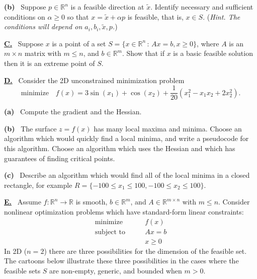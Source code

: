 \documentclass[11pt]{amsart}
\newcommand{\RR}{{\mathbb{R}}}
\newcommand{\prob}[1]{\bigskip\noindent\large\textbf{\underline{#1.}} \, \normalsize}
\newcommand{\epart}[1]{\medskip\noindent \textbf{(#1)} \,}
\begin{document}
\epart{b}  Suppose $p\in\RR^n$ is a feasible direction at $\tilde x$.  Identify necessary and sufficient conditions on $\alpha \ge 0$ so that $x = \tilde x + \alpha p$ is feasible, that is, $x\in S$.  (\emph{Hint. The conditions will depend on $a_i,b_i,\tilde x,p$.})


\prob{C}  Suppose $x$ is a point of a set $S = \{x \in \RR^n\,:\,Ax=b, x\ge 0\}$, where $A$ is an $m\times n$ matrix with $m\le n$, and $b\in\RR^m$.  Show that if $x$ is a basic feasible solution then it is an extreme point of $S$.


\prob{D}  Consider the 2D unconstrained minimization problem
    $$\text{minimize} \quad f(x)=3\sin(x_1)+\cos(x_2) + \frac{1}{20} \left(x_1^2 - x_1 x_2 + 2 x_2^2\right).$$

\epart{a} Compute the gradient and the Hessian.

\epart{b} The surface $z=f(x)$ has many local maxima and minima.  Choose an algorithm which would quickly find a local minima, and write a pseudocode for this algorithm.  Choose an algorithm which uses the Hessian and which has guarantees of finding critical points.

\epart{c} Describe an algorithm which would find all of the local minima in a closed rectangle, for example $R=\{-100\le x_1 \le 100, -100\le x_2 \le 100\}$.


\prob{E}  Assume $f:\RR^n\to\RR$ is smooth, $b\in \RR^m$, and $A\in \RR^{m\times n}$ with $m\le n$.  Consider nonlinear optimization problems which have standard-form linear constraints:
    $$\begin{matrix}
    \text{minimize} \qquad & f(x) \\
    \text{subject to} \qquad & Ax = b \\
                      & x \ge 0
    \end{matrix}$$
In 2D ($n=2$) there are three possibilities for the dimension of the feasible set.  The cartoons below illustrate these three possibilities in the cases where the feasible sets $S$ are non-empty, generic, and bounded when $m>0$.

\bigskip
{}
\qquad
{}
\qquad
{}
\end{document}

